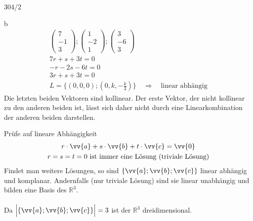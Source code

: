 \begin{exercise}{304/2}
  \item [b]
  \begin{gather*}
    \begin{pmatrix}7 \\ -1 \\ 3\end{pmatrix}; \begin{pmatrix}1 \\ -2 \\ 1\end{pmatrix}; \begin{pmatrix}3 \\ -6 \\ 3\end{pmatrix} \\
    7r + s + 3t = 0 \\
    -r - 2s -6t = 0 \\
    3r + s + 3t = 0 \\
    L = \{(0, 0, 0); (0, k, -\frac{k}{3})\} \quad\Rightarrow\quad \text{linear abhängig}
  \end{gather*}
  Die letzten beiden Vektoren sind kollinear. Der erste Vektor, der nicht kollinear zu den anderen beiden ist, lässt sich daher nicht durch eine Linearkombination der anderen beiden darstellen.
\end{exercise}
Prüfe auf lineare Abhängigkeit
\begin{gather*}
  r \cdot \vv{a} + s \cdot \vv{b} + t \cdot \vv{c} = \vv{0} \\
  r = s = t = 0 \text{ ist immer eine Lösung (triviale Lösung)}
\end{gather*}
Findet man weitere Lösungen, so sind $\{\vv{a}; \vv{b}; \vv{c}\}$ linear abhängig und komplanar. Andernfalls (nur triviale Lösung) sind sie linear unabhängig und bilden eine Basis des $\mathbb{R}^3$. \\\\
Da $\Bigl|\left\{\vv{a}; \vv{b}; \vv{c}\right\}\Bigr| = 3$ ist der $\mathbb{R}^3$ dreidimensional.
